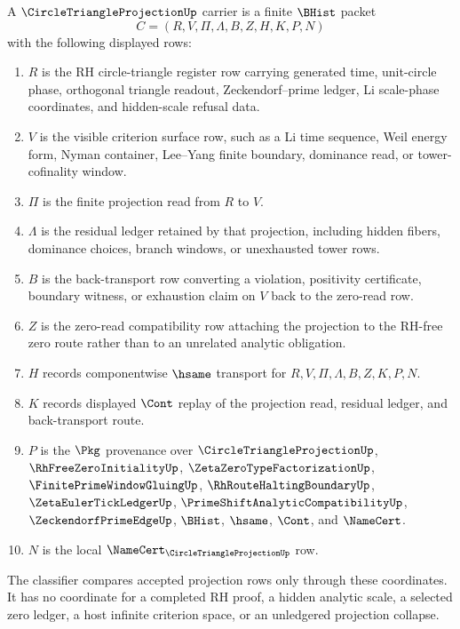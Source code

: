 \begin{definition}
\label{def:circle-triangle-projection-namecert-carrier}
A $\CircleTriangleProjectionUp$ carrier is a finite $\BHist$ packet
$$
C=(R,V,\Pi,\Lambda,B,Z,H,K,P,N)
$$
with the following displayed rows:
\begin{enumerate}
\item $R$ is the RH circle-triangle register row carrying generated time, unit-circle phase, orthogonal triangle readout, Zeckendorf--prime ledger, Li scale-phase coordinates, and hidden-scale refusal data.
\item $V$ is the visible criterion surface row, such as a Li time sequence, Weil energy form, Nyman container, Lee--Yang finite boundary, dominance read, or tower-cofinality window.
\item $\Pi$ is the finite projection read from $R$ to $V$.
\item $\Lambda$ is the residual ledger retained by that projection, including hidden fibers, dominance choices, branch windows, or unexhausted tower rows.
\item $B$ is the back-transport row converting a violation, positivity certificate, boundary witness, or exhaustion claim on $V$ back to the zero-read row.
\item $Z$ is the zero-read compatibility row attaching the projection to the RH-free zero route rather than to an unrelated analytic obligation.
\item $H$ records componentwise $\hsame$ transport for $R,V,\Pi,\Lambda,B,Z,K,P,N$.
\item $K$ records displayed $\Cont$ replay of the projection read, residual ledger, and back-transport route.
\item $P$ is the $\Pkg$ provenance over $\CircleTriangleProjectionUp$, $\RhFreeZeroInitialityUp$, $\ZetaZeroTypeFactorizationUp$, $\FinitePrimeWindowGluingUp$, $\RhRouteHaltingBoundaryUp$, $\ZetaEulerTickLedgerUp$, $\PrimeShiftAnalyticCompatibilityUp$, $\ZeckendorfPrimeEdgeUp$, $\BHist$, $\hsame$, $\Cont$, and $\NameCert$.
\item $N$ is the local $\NameCert_{\CircleTriangleProjectionUp}$ row.
\end{enumerate}
The classifier compares accepted projection rows only through these coordinates. It has no coordinate for a completed RH proof, a hidden analytic scale, a selected zero ledger, a host infinite criterion space, or an unledgered projection collapse.
\end{definition}


